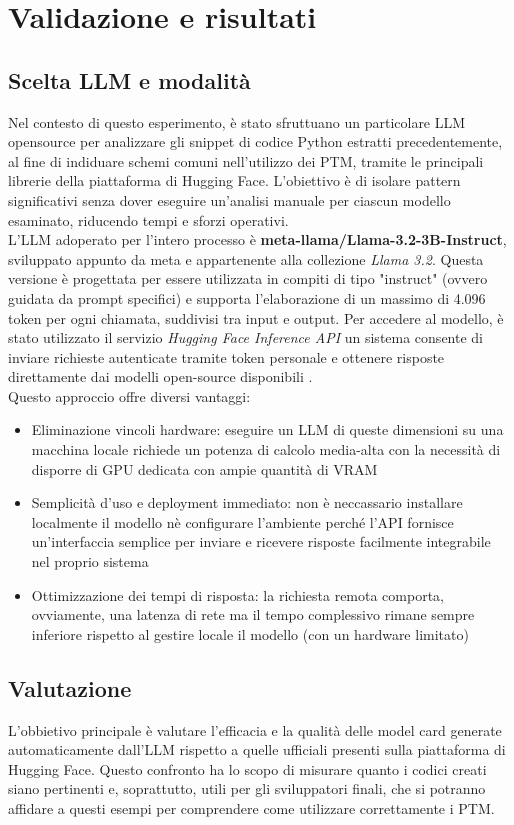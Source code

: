 \documentclass{article}
\begin{document}
\section{Validazione e risultati}



\subsection{Scelta LLM e modalità}
Nel contesto di questo esperimento, è stato sfruttuano un particolare LLM opensource per analizzare gli snippet di codice Python estratti precedentemente, al fine di indiduare schemi comuni nell'utilizzo dei PTM, tramite le principali librerie della piattaforma di Hugging Face.
L'obiettivo è di isolare pattern significativi senza dover eseguire un'analisi manuale per ciascun modello esaminato, riducendo tempi e sforzi operativi.\\
L'LLM adoperato per l'intero processo è \textbf{meta-llama/Llama-3.2-3B-Instruct}, sviluppato appunto da meta e appartenente alla collezione \textit{Llama 3.2}. Questa versione è progettata per essere utilizzata in compiti di tipo "instruct" (ovvero guidata da prompt specifici) e supporta l’elaborazione di un massimo di 4.096 token per ogni chiamata, suddivisi tra input e output.  
Per accedere al modello, è stato utilizzato il servizio \textit{Hugging Face Inference API} un sistema consente di inviare richieste autenticate tramite token personale e ottenere risposte direttamente dai modelli open-source disponibili .\\
Questo approccio offre diversi vantaggi:
\begin{itemize}
    \item Eliminazione vincoli hardware: eseguire un LLM di queste dimensioni su una macchina locale richiede un potenza di calcolo media-alta con la necessità di disporre di GPU dedicata con ampie quantità di VRAM
    \item Semplicità d'uso e deployment immediato: non è neccassario installare localmente il modello nè configurare l'ambiente perché l'API fornisce un'interfaccia semplice per inviare e ricevere risposte facilmente integrabile nel proprio sistema
    \item Ottimizzazione dei tempi di risposta: la richiesta remota comporta, ovviamente, una latenza di rete ma il tempo complessivo rimane sempre inferiore rispetto al gestire locale il modello (con un hardware limitato)
\end{itemize}
\subsection{Valutazione}
L'obbietivo principale è valutare l'efficacia e la qualità delle model card generate automaticamente dall'LLM rispetto a quelle ufficiali presenti sulla piattaforma di Hugging Face.  Questo confronto ha lo scopo di misurare quanto i codici creati siano pertinenti e, soprattutto, utili per gli sviluppatori finali, che si potranno affidare a questi esempi per comprendere come utilizzare correttamente i PTM.
\end{document}
